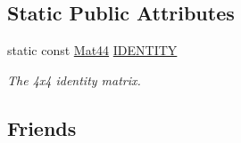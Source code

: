 \subsection*{Static Public Attributes}
\begin{DoxyCompactItemize}
\item 
static const \hyperlink{structgfxmath_1_1_mat44}{Mat44} \hyperlink{structgfxmath_1_1_mat44_acf3201b485f8e67fd931703fb2c55ead}{I\+D\+E\+N\+T\+I\+T\+Y}
\begin{DoxyCompactList}\small\item\em The 4x4 identity matrix. \end{DoxyCompactList}\end{DoxyCompactItemize}
\subsection*{Friends}
